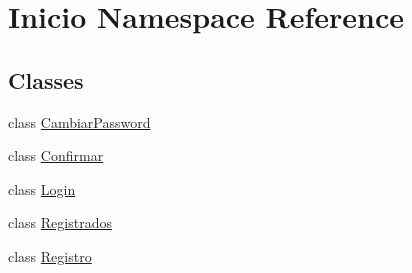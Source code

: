 \hypertarget{namespace_inicio}{}\section{Inicio Namespace Reference}
\label{namespace_inicio}
\subsection*{Classes}
\begin{DoxyCompactItemize}
\item 
class \mbox{\hyperlink{class_inicio_1_1_cambiar_password}{Cambiar\+Password}}
\item 
class \mbox{\hyperlink{class_inicio_1_1_confirmar}{Confirmar}}
\item 
class \mbox{\hyperlink{class_inicio_1_1_login}{Login}}
\item 
class \mbox{\hyperlink{class_inicio_1_1_registrados}{Registrados}}
\item 
class \mbox{\hyperlink{class_inicio_1_1_registro}{Registro}}
\end{DoxyCompactItemize}
